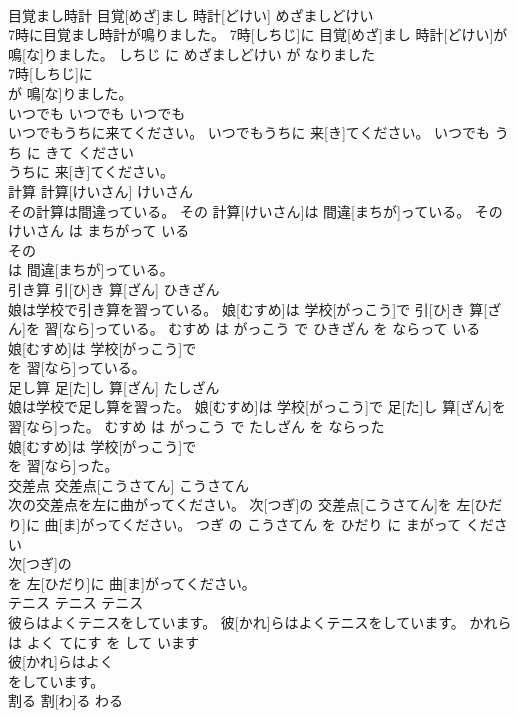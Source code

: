 \documentclass[8pt]{extreport}
\begin{document}
\begin{CJK}{UTF8}{min}
\\	目覚まし時計	目覚[めざ]まし 時計[どけい]	めざましどけい	
\\	7時に目覚まし時計が鳴りました。	7時[しちじ]に 目覚[めざ]まし 時計[どけい]が 鳴[な]りました。	しちじ に めざましどけい が なりました	
\\	7時[しちじ]に
\\	が 鳴[な]りました。			
\\	いつでも	いつでも	いつでも	
\\	いつでもうちに来てください。	いつでもうちに 来[き]てください。	いつでも うち に きて ください	
\\	うちに 来[き]てください。			
\\	計算	計算[けいさん]	けいさん	
\\	その計算は間違っている。	その 計算[けいさん]は 間違[まちが]っている。	その けいさん は まちがって いる	
\\	その
\\	は 間違[まちが]っている。			
\\	引き算	引[ひ]き 算[ざん]	ひきざん	
\\	娘は学校で引き算を習っている。	娘[むすめ]は 学校[がっこう]で 引[ひ]き 算[ざん]を 習[なら]っている。	むすめ は がっこう で ひきざん を ならって いる	
\\	娘[むすめ]は 学校[がっこう]で
\\	を 習[なら]っている。			
\\	足し算	足[た]し 算[ざん]	たしざん	
\\	娘は学校で足し算を習った。	娘[むすめ]は 学校[がっこう]で 足[た]し 算[ざん]を 習[なら]った。	むすめ は がっこう で たしざん を ならった	
\\	娘[むすめ]は 学校[がっこう]で
\\	を 習[なら]った。			
\\	交差点	交差点[こうさてん]	こうさてん	
\\	次の交差点を左に曲がってください。	次[つぎ]の 交差点[こうさてん]を 左[ひだり]に 曲[ま]がってください。	つぎ の こうさてん を ひだり に まがって ください	
\\	次[つぎ]の
\\	を 左[ひだり]に 曲[ま]がってください。			
\\	テニス	テニス	テニス	
\\	彼らはよくテニスをしています。	彼[かれ]らはよくテニスをしています。	かれら は よく てにす を して います	
\\	彼[かれ]らはよく
\\	をしています。			
\\	割る	割[わ]る	わる	

\end{CJK}
\end{document}
